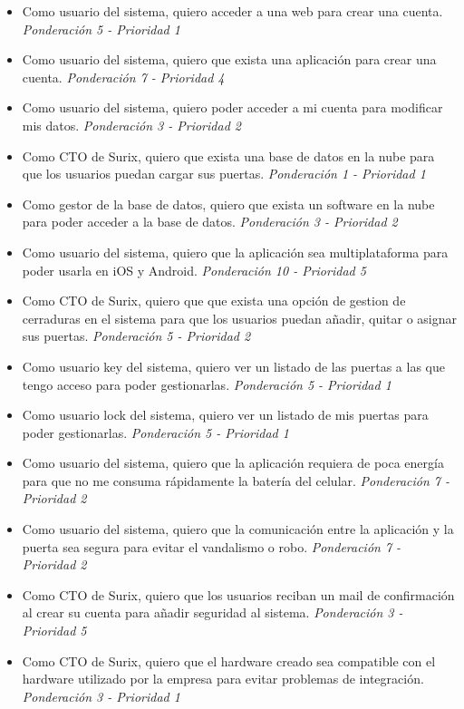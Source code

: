 \documentclass[11pt]{charter}
\begin{document}
\begin{itemize}
\item Como usuario del sistema, quiero acceder a una web para crear una cuenta.\textit{ Ponderación 5 - Prioridad 1} 
\item Como usuario del sistema, quiero que exista una aplicación para crear una cuenta.\textit{ Ponderación 7 - Prioridad 4}
\item Como usuario del sistema, quiero poder acceder a mi cuenta para modificar mis datos.\textit{ Ponderación 3 - Prioridad 2}
\item Como CTO de Surix, quiero que exista una base de datos en la nube para que los usuarios puedan cargar sus puertas.\textit{ Ponderación 1 - Prioridad 1}
\item Como gestor de la base de datos, quiero que exista un software en la nube para poder acceder a la base de datos.\textit{ Ponderación 3 - Prioridad 2}
\item Como usuario del sistema, quiero que la aplicación sea multiplataforma para poder usarla en iOS y Android.\textit{ Ponderación 10 - Prioridad 5}
\item Como CTO de Surix, quiero que que exista una opción de gestion de cerraduras en el sistema para que los usuarios puedan añadir, quitar o asignar sus puertas.\textit{ Ponderación 5 - Prioridad 2}
\item Como usuario key del sistema, quiero ver un listado de las puertas a las que tengo acceso para poder gestionarlas.\textit{ Ponderación 5 - Prioridad 1}
\item Como usuario lock del sistema, quiero ver un listado de mis puertas para poder gestionarlas.\textit{ Ponderación 5 - Prioridad 1}
\item Como usuario del sistema, quiero que la aplicación requiera de poca energía para que no me consuma rápidamente la batería del celular.\textit{ Ponderación 7 - Prioridad 2}
\item Como usuario del sistema, quiero que la comunicación entre la aplicación y la puerta sea segura para evitar el vandalismo o robo.\textit{ Ponderación 7 - Prioridad 2}
\item Como CTO de Surix, quiero que los usuarios reciban un mail de confirmación al crear su cuenta para añadir seguridad al sistema.\textit{ Ponderación 3 - Prioridad 5}
\item Como CTO de Surix, quiero que el hardware creado sea compatible con el hardware utilizado por la empresa para evitar problemas de integración.\textit{ Ponderación 3 - Prioridad 1}

\end{itemize}
\end{document}
